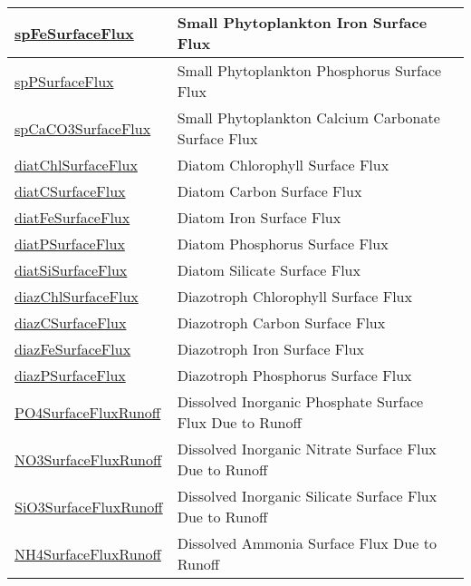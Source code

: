 {\begin{center}
\begin{longtable}{| p{2.0in} | p{4.0in} |}
    \hline
    \hyperref[subsec:var_sec_forcing_spFeSurfaceFlux]{spFeSurfaceFlux} & Small Phytoplankton Iron Surface Flux \\
    \hline
    \hyperref[subsec:var_sec_forcing_spPSurfaceFlux]{spPSurfaceFlux} & Small Phytoplankton Phosphorus Surface Flux \\
    \hline
    \hyperref[subsec:var_sec_forcing_spCaCO3SurfaceFlux]{spCaCO3SurfaceFlux} & Small Phytoplankton Calcium Carbonate Surface Flux \\
    \hline
    \hyperref[subsec:var_sec_forcing_diatChlSurfaceFlux]{diatChlSurfaceFlux} & Diatom Chlorophyll Surface Flux \\
    \hline
    \hyperref[subsec:var_sec_forcing_diatCSurfaceFlux]{diatCSurfaceFlux} & Diatom Carbon Surface Flux \\
    \hline
    \hyperref[subsec:var_sec_forcing_diatFeSurfaceFlux]{diatFeSurfaceFlux} & Diatom Iron Surface Flux \\
    \hline
    \hyperref[subsec:var_sec_forcing_diatPSurfaceFlux]{diatPSurfaceFlux} & Diatom Phosphorus Surface Flux \\
    \hline
    \hyperref[subsec:var_sec_forcing_diatSiSurfaceFlux]{diatSiSurfaceFlux} & Diatom Silicate Surface Flux \\
    \hline
    \hyperref[subsec:var_sec_forcing_diazChlSurfaceFlux]{diazChlSurfaceFlux} & Diazotroph Chlorophyll Surface Flux \\
    \hline
    \hyperref[subsec:var_sec_forcing_diazCSurfaceFlux]{diazCSurfaceFlux} & Diazotroph Carbon Surface Flux \\
    \hline
    \hyperref[subsec:var_sec_forcing_diazFeSurfaceFlux]{diazFeSurfaceFlux} & Diazotroph Iron Surface Flux \\
    \hline
    \hyperref[subsec:var_sec_forcing_diazPSurfaceFlux]{diazPSurfaceFlux} & Diazotroph Phosphorus Surface Flux \\
    \hline
    \hyperref[subsec:var_sec_forcing_PO4SurfaceFluxRunoff]{PO4SurfaceFluxRunoff} & Dissolved Inorganic Phosphate Surface Flux Due to Runoff \\
    \hline
    \hyperref[subsec:var_sec_forcing_NO3SurfaceFluxRunoff]{NO3SurfaceFluxRunoff} & Dissolved Inorganic Nitrate Surface Flux Due to Runoff \\
    \hline
    \hyperref[subsec:var_sec_forcing_SiO3SurfaceFluxRunoff]{SiO3SurfaceFluxRunoff} & Dissolved Inorganic Silicate Surface Flux Due to Runoff \\
    \hline
    \hyperref[subsec:var_sec_forcing_NH4SurfaceFluxRunoff]{NH4SurfaceFluxRunoff} & Dissolved Ammonia Surface Flux Due to Runoff \\

\end{longtable}
\end{center}}
